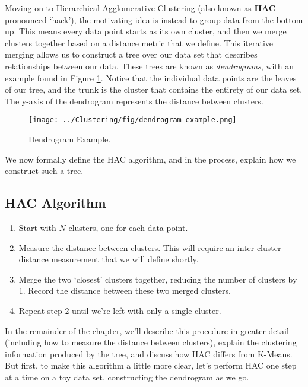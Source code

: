 Moving on to Hierarchical Agglomerative Clustering (also known as \textbf{HAC} - pronounced `hack'), the motivating idea is instead to group data from the bottom up. This means every data point starts as its own cluster, and then we merge clusters together based on a distance metric that we define. This iterative merging allows us to construct a tree over our data set that describes relationships between our data. These trees are known as \textit{dendrograms}, with an example found in Figure \ref{fig:dendrogram-example}. Notice that the individual data points are the leaves of our tree, and the trunk is the cluster that contains the entirety of our data set. The y-axis of the dendrogram represents the distance between clusters.

\begin{figure}
    \centering
    \texttt{[image: ../Clustering/fig/dendrogram-example.png]}
    \caption{Dendrogram Example.}
    \label{fig:dendrogram-example}
\end{figure}

We now formally define the HAC algorithm, and in the process, explain how we construct such a tree.

\subsection{HAC Algorithm}
\begin{enumerate}
    \item Start with $N$ clusters, one for each data point.
    \item Measure the distance between clusters. This will require an inter-cluster distance measurement that we will define shortly.
    \item Merge the two `closest' clusters together, reducing the number of clusters by 1. Record the distance between these two merged clusters.
    \item Repeat step 2 until we're left with only a single cluster.
\end{enumerate}

In the remainder of the chapter, we'll describe this procedure in greater detail (including how to measure the distance between clusters), explain the clustering information produced by the tree, and discuss how HAC differs from K-Means. But first, to make this algorithm a little more clear, let's perform HAC one step at a time on a toy data set, constructing the dendrogram as we go.


